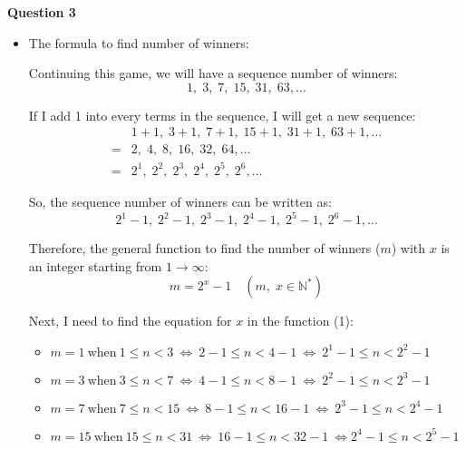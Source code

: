 \documentclass[12pt]{article}
\begin{document}
\textbf{Question 3}

\begin{itemize}
    \item The formula to find number of winners:\par
    
Continuing this game, we will have a sequence number of winners: 
$$1,\; 3,\; 7,\; 15,\; 31,\; 63, \dots $$

If I add 1 into every terms in the sequence, I will get a new sequence:
\begin{align*}
    & 1+1,\; 3+1,\; 7+1,\; 15+1,\; 31+1,\; 63+1, \dots \\
    =& 2,\; 4,\; 8,\; 16,\; 32,\; 64, \dots \\
    =& 2^1,\; 2^2,\; 2^3,\; 2^4,\; 2^5,\; 2^6, \dots
\end{align*}

So, the sequence number of winners can be written as:
$$2^1-1,\; 2^2-1,\; 2^3-1,\; 2^4-1,\; 2^5-1,\; 2^6-1, \dots$$

Therefore, the general function to find the number of winners ($m$) with $x$ is an integer starting from $1\to \infty$:
\begin{equation}
    m=2^x-1 \quad\left(m,\;x\in \mathbb{N^*} \right)
\end{equation}
\par 


Next, I need to find the equation for $x$ in the function (1):
\begin{itemize}
    \item $m=1\ \text{when}\ 1\leqslant n<3\  \Longleftrightarrow\ 2-1\leqslant n<4-1\ 
    \Longleftrightarrow\ 2^1-1\leqslant n<2^2-1$ \par
    
    \item $m=3\ \text{when}\ 3\leqslant n<7\  \Longleftrightarrow\ 4-1\leqslant n<8-1\ 
    \Longleftrightarrow\ 2^2-1\leqslant n<2^3-1$ \par
    
    \item $m=7\ \text{when}\ 7\leqslant n<15\ 
    \Longleftrightarrow\ 8-1\leqslant n<16-1\ 
    \Longleftrightarrow\ 2^3-1\leqslant n<2^4-1$ \par
    
    \item $m=15\ \text{when}\ 15\leqslant n<31\  \Longleftrightarrow\ 16-1\leqslant n<32-1\ 
    \Longleftrightarrow 2^4-1\leqslant n<2^5-1$ \par
    

\end{itemize}
\end{itemize}
\end{document}
